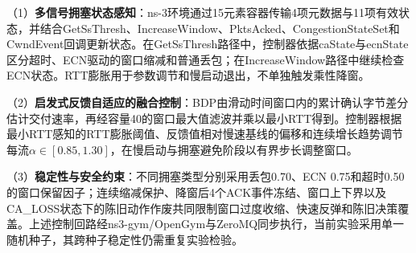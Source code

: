 （1）\textbf{多信号拥塞状态感知}：ns-3环境通过15元素容器传输4项元数据与11项有效状态，并结合GetSsThresh、IncreaseWindow、PktsAcked、CongestionStateSet和CwndEvent回调更新状态。在GetSsThresh路径中，控制器依据caState与ecnState区分超时、ECN驱动的窗口缩减和普通丢包；在IncreaseWindow路径中继续检查ECN状态。RTT膨胀用于参数调节和慢启动退出，不单独触发乘性降窗。

（2）\textbf{启发式反馈自适应的融合控制}：BDP由滑动时间窗口内的累计确认字节差分估计交付速率，再经容量40的窗口最大值滤波并乘以最小RTT得到。控制器根据最小RTT感知的RTT膨胀阈值、反馈值相对慢速基线的偏移和连续增长趋势调节每流$\alpha\in[0.85,1.30]$，在慢启动与拥塞避免阶段以有界步长调整窗口。

（3）\textbf{稳定性与安全约束}：不同拥塞类型分别采用丢包0.70、ECN 0.75和超时0.50的窗口保留因子；连续缩减保护、降窗后4个ACK事件冻结、窗口上下界以及CA\_LOSS状态下的陈旧动作作废共同限制窗口过度收缩、快速反弹和陈旧决策覆盖。上述控制回路经ns3-gym/OpenGym与ZeroMQ同步执行，当前实验采用单一随机种子，其跨种子稳定性仍需重复实验检验。

